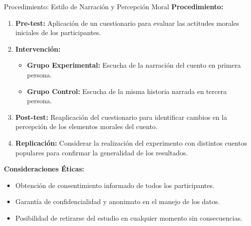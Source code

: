 ﻿\documentclass{beamer}
\begin{document}
\begin{frame}{Procedimiento: Estilo de Narración y Percepción Moral}
  \textbf{Procedimiento:}
  \begin{enumerate}
      \item \textbf{Pre-test:} Aplicación de un cuestionario para evaluar las actitudes morales iniciales de los participantes.
      \item \textbf{Intervención:}
      \begin{itemize}
          \item \textbf{Grupo Experimental:} Escucha de la narración del cuento en primera persona.
          \item \textbf{Grupo Control:} Escucha de la misma historia narrada en tercera persona.
      \end{itemize}
      \item \textbf{Post-test:} Reaplicación del cuestionario para identificar cambios en la percepción de los elementos morales del cuento.
      \item \textbf{Replicación:} Considerar la realización del experimento con distintos cuentos populares para confirmar la generalidad de los resultados.
  \end{enumerate}
  
  \vspace{2mm}
  \textbf{Consideraciones Éticas:}
  \begin{itemize}
      \item Obtención de consentimiento informado de todos los participantes.
      \item Garantía de confidencialidad y anonimato en el manejo de los datos.
      \item Posibilidad de retirarse del estudio en cualquier momento sin consecuencias.
  \end{itemize}

\end{frame}
\end{document}
